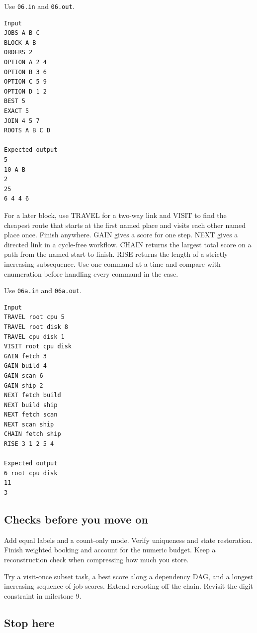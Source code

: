 \documentclass[11pt,letterpaper]{article}
\begin{document}
Use \texttt{06.in} and \texttt{06.out}.

\begin{samepage}
\small
\begin{verbatim}
Input
JOBS A B C
BLOCK A B
ORDERS 2
OPTION A 2 4
OPTION B 3 6
OPTION C 5 9
OPTION D 1 2
BEST 5
EXACT 5
JOIN 4 5 7
ROOTS A B C D

Expected output
5
10 A B
2
25
6 4 4 6
\end{verbatim}
\end{samepage}

For a later block, use TRAVEL for a two-way link and VISIT to find the cheapest route that starts at the first named place and visits each other named place once. Finish anywhere. GAIN gives a score for one step. NEXT gives a directed link in a cycle-free workflow. CHAIN returns the largest total score on a path from the named start to finish. RISE returns the length of a strictly increasing subsequence. Use one command at a time and compare with enumeration before handling every command in the case.

Use \texttt{06a.in} and \texttt{06a.out}.

\begin{samepage}
\small
\begin{verbatim}
Input
TRAVEL root cpu 5
TRAVEL root disk 8
TRAVEL cpu disk 1
VISIT root cpu disk
GAIN fetch 3
GAIN build 4
GAIN scan 6
GAIN ship 2
NEXT fetch build
NEXT build ship
NEXT fetch scan
NEXT scan ship
CHAIN fetch ship
RISE 3 1 2 5 4

Expected output
6 root cpu disk
11
3
\end{verbatim}
\end{samepage}

\subsection*{Checks before you move on}

Add equal labels and a count-only mode. Verify uniqueness and state restoration. Finish weighted booking and account for the numeric budget. Keep a reconstruction check when compressing how much you store.

Try a visit-once subset task, a best score along a dependency DAG, and a longest increasing sequence of job scores. Extend rerooting off the chain. Revisit the digit constraint in milestone 9.

\subsection*{Stop here}
\end{document}

